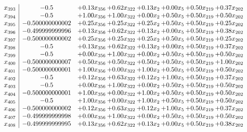 \documentclass[8pt]{article}
\begin{document}
\[\begin{array}{c| c c@{\hskip 2pt} c@{\hskip 2pt} c@{\hskip 2pt} c@{\hskip 2pt} c@{\hskip 2pt} c@{\hskip 2pt} }
 x_{393}   &  -0.5 & +  0.13 x_{356} & +  0.62 x_{322} & +  0.13 x_{2} & +  0.00 x_{5} & +  0.50 x_{219} & +  0.37 x_{202}\\
 x_{394}   &  -0.5 & +  1.00 x_{356} & +  1.00 x_{322} & +  0.00 x_{2} & +  0.50 x_{5} & +  0.50 x_{219} & +  0.50 x_{202}\\
 x_{395}   &  -0.500000000002 & +  0.25 x_{356} & +  0.25 x_{322} & +  0.25 x_{2} & +  0.50 x_{5} & +  0.50 x_{219} & +  0.25 x_{202}\\
 x_{396}   &  -0.499999999996 & +  0.13 x_{356} & +  0.62 x_{322} & +  0.13 x_{2} & +  0.00 x_{5} & +  0.50 x_{219} & +  0.38 x_{202}\\
 x_{397}   &  -0.500000000002 & +  0.25 x_{356} & +  0.25 x_{322} & +  0.25 x_{2} & +  0.50 x_{5} & +  0.50 x_{219} & +  0.25 x_{202}\\
 x_{398}   &  -0.5 & +  0.13 x_{356} & +  0.62 x_{322} & +  0.13 x_{2} & +  0.00 x_{5} & +  0.50 x_{219} & +  0.37 x_{202}\\
 x_{399}   &  -0.5 & +  0.00 x_{356} & +  1.00 x_{322} & +  0.00 x_{2} & +  0.50 x_{5} & +  0.50 x_{219} & +  0.50 x_{202}\\
 x_{400}   &  -0.500000000007 & +  0.50 x_{356} & +  0.50 x_{322} & +  0.50 x_{2} & +  0.50 x_{5} & +  0.50 x_{219} & +  1.00 x_{202}\\
 x_{401}   &  -0.500000000001 & +  1.00 x_{356} & +  0.00 x_{322} & +  1.00 x_{2} & +  0.50 x_{5} & +  0.50 x_{219} & +  0.50 x_{202}\\
 x_{402}   &  -0.5 & +  0.12 x_{356} & +  0.63 x_{322} & +  0.12 x_{2} & +  1.00 x_{5} & +  0.50 x_{219} & +  0.37 x_{202}\\
 x_{403}   &  -0.5 & +  0.00 x_{356} & +  1.00 x_{322} & +  0.00 x_{2} & +  0.50 x_{5} & +  0.50 x_{219} & +  0.50 x_{202}\\
 x_{404}   &  -0.500000000001 & +  1.00 x_{356} & +  0.00 x_{322} & +  1.00 x_{2} & +  0.50 x_{5} & +  0.50 x_{219} & +  0.50 x_{202}\\
 x_{405}   &  -0.5 & +  1.00 x_{356} & +  0.00 x_{322} & +  1.00 x_{2} & +  0.50 x_{5} & +  0.50 x_{219} & +  0.50 x_{202}\\
 x_{406}   &  -0.500000000002 & +  0.12 x_{356} & +  0.63 x_{322} & +  0.12 x_{2} & +  1.00 x_{5} & +  0.50 x_{219} & +  0.37 x_{202}\\
 x_{407}   &  -0.499999999998 & +  0.00 x_{356} & +  1.00 x_{322} & +  0.00 x_{2} & +  0.50 x_{5} & +  0.50 x_{219} & +  0.50 x_{202}\\
 x_{408}   &  -0.499999999995 & +  0.13 x_{356} & +  0.62 x_{322} & +  0.13 x_{2} & +  0.00 x_{5} & +  0.50 x_{219} & +  0.38 x_{202}\\

\end{array}\]
\end{document}
